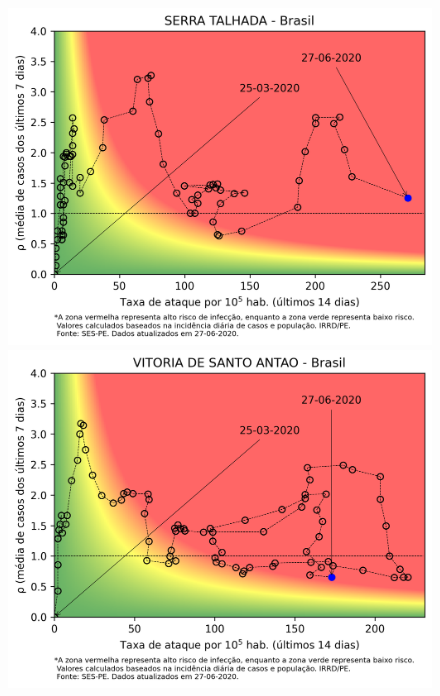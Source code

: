 \documentclass[]{article}
\begin{document}
\begin{figure}[!h]
	\begin{minipage}[t]{4cm}
		\centering
		\includegraphics[scale=0.5]{../SERRATALHADA.png}
	\end{minipage}
	\hspace{5cm}
	\begin{minipage}[t]{4cm}
		\centering
		\includegraphics[scale=0.5]{../VITORIADESANTOANTAO.png}
		\vspace{0.2cm}
	\end{minipage}


\end{figure}
\end{document}
